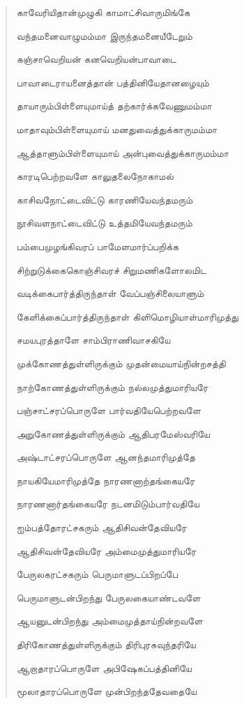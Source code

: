 \documentclass{article}
\begin{document}
\begin{quotation}
{காவேரியிதான்முழுகி காமாட்சிவாருமிங்கே

வந்தமனைவாழுமம்மா இருந்தமனையீடேறும்

கஞ்சாவெறியன் கனவெறியன்பாவாடை

பாவாடைராயனைத்தான் பத்தினியேதானழையும்

தாயாரும்பிள்ளையுமாய்த் தற்கார்க்கவேணுமம்மா

மாதாவும்பிள்ளையுமாய் மனதுவைத்துக்காருமம்மா

ஆத்தாளும்பிள்ளையுமாய் அன்புவைத்துக்காருமம்மா

காரடிபெற்றவளே காலுதலைநோகாமல்

காசிவநோட்டைவிட்டு காரணியேவந்தமரும்

நூசிவளநாட்டைவிட்டு உத்தமியேவந்தமரும்

பம்பைமுழங்கிவரப் பாமேளமார்ப்பறிக்க

சிற்றுடுக்கைகொஞ்சிவரச் சிறுமணிகளோலமிட

வடிக்கைபார்த்திருந்தாள் வேப்பஞ்சிலையாளும்

கேளிக்கைப்பார்த்திருந்தாள் கிளிமொழியாள்மாரிமுத்து

சமயபுரத்தாளே சாம்பிராணிவாசகியே

முக்கோணத்துள்ளிருக்கும் முதன்மையாய்நின்றசத்தி

நாற்கோணத்துள்ளிருக்கும் நல்லமுத்துமாரியரே

பஞ்சாட்சரப்பொருளே பார்வதியேபெற்றவளே

அறுகோணத்துள்ளிருக்கும் ஆதிபரமேஸ்வரியே

அஷ்டாட்சரப்பொருளே ஆனந்தமாரிமுத்தே

நாயகியேமாரிமுத்தே நாரணனாற்தங்கையரே

நாரணனார்தங்கையரே நடனமிடும்பார்வதியே

ஐம்பத்தோரட்சகரும் ஆதிசிவன்தேவியரே

ஆதிசிவன்தேவியரே அம்மைமுத்துமாரியரே

பேருலகரட்சகரும் பெருமாளுடப்பிறப்பே

பெருமாளுடன்பிறந்து பேருலகையாண்டவளே

ஆயனுடன்பிறந்து அம்மைமுத்தாய்நின்றவளே

திரிகோணத்துள்ளிருக்கும் திரிபுரசுவுந்தரியே

ஆறாதாரப்பொருளே அபிஷேகப்பத்தினியே

மூலாதாரப்பொருளே முன்பிறந்ததேவதையே

}
\end{quotation}
\end{document}
